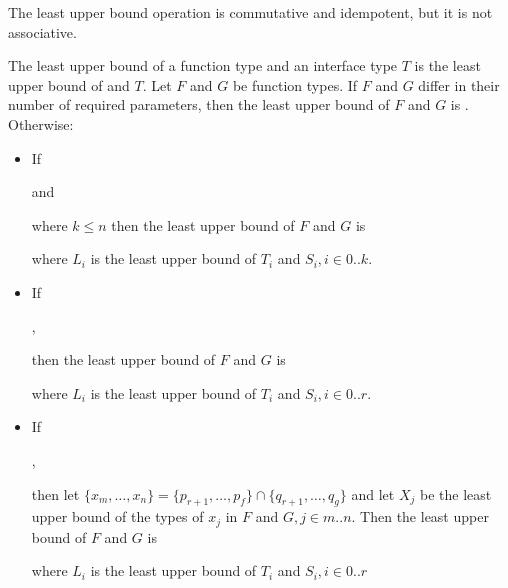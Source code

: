 \documentclass{article}
\begin{document}
\LMHash{}
The least upper bound operation is commutative and idempotent,
but it is not associative.


\LMHash{}
The least upper bound of a function type and an interface type $T$ is the least upper bound of \FUNCTION{} and $T$.
Let $F$ and $G$ be function types.
If $F$ and $G$ differ in their number of required parameters,
then the least upper bound of $F$ and $G$ is \FUNCTION{}.
Otherwise:
\begin{itemize}
\item If

 and


\noindent
where $k \le n$ then the least upper bound of $F$ and $G$ is


\noindent
where $L_i$ is the least upper bound of $T_i$ and $S_i, i \in 0 .. k$.
\item If

,


\noindent
then the least upper bound of $F$ and $G$ is


\noindent
where $L_i$ is the least upper bound of $T_i$ and $S_i, i \in 0 .. r$.
\item If

,


then let
$\{x_m, \ldots, x_n\} = \{p_{r+1}, \ldots, p_f\} \cap \{q_{r+1}, \ldots, q_g\}$
and let $X_j$ be the least upper bound of the types of $x_j$ in $F$ and
$G, j \in m .. n$.
Then the least upper bound of $F$ and $G$ is


where $L_i$ is the least upper bound of $T_i$ and $S_i, i \in 0 .. r$
\end{itemize}
\end{document}
